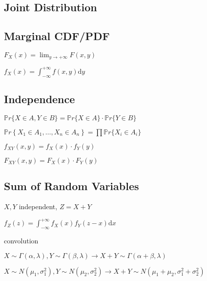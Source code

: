 \documentclass[9pt,landscape]{article}
\begin{document}
\begin{multicols}{3}
\section{Joint Distribution}

\subsection{Marginal CDF/PDF}
$F_X(x)=\lim_{y\to +\infty}F(x, y)$

$f_X(x)=\int_{-\infty}^{+\infty}f(x, y)\mathrm{d}y$

\subsection{Independence}

$\mathbb{P}r\{X\in A, Y\in B\}=\mathbb{P}r\{X\in A\}\cdot\mathbb{P}r\{Y\in B\}$

$\mathbb{P}r\left\{X_1 \in A_1, \ldots, X_n \in A_n\right\} = \prod \mathbb{P}r\{X_i \in A_i\}$

$f_{XY}(x, y)=f_X(x)\cdot f_Y(y)$

$F_{XY}(x, y)=F_X(x)\cdot F_Y(y)$

\subsection{Sum of Random Variables}

$X, Y$ independent, $Z=X+Y$

$f_Z(z)=\int_{-\infty}^{+\infty}f_X(x)f_Y(z-x)\mathrm{d}x$

convolution

$X\sim \Gamma(\alpha, \lambda), Y\sim \Gamma(\beta, \lambda)\to X+Y\sim\Gamma(\alpha+\beta, \lambda)$

$X\sim N(\mu_1,\sigma_1^2), Y\sim N(\mu_2,\sigma_2^2)\to X+Y\sim N(\mu_1+\mu_2,\sigma_1^2+\sigma_2^2)$


\end{multicols}
\end{document}
